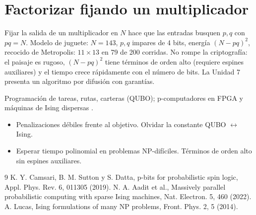 \documentclass[11pt,a4paper]{article}
\begin{document}
\section{Factorizar fijando un multiplicador}
Fijar la salida de un multiplicador en $N$ hace que las entradas busquen $p,q$ con $pq=N$. Modelo de juguete: $N=143$, $p,q$ impares de 4 bits, energía
$(N-pq)^2$, recocido de Metropolis: $11\times13$ en 79 de 200 corridas. No rompe la criptografía: el paisaje es rugoso, $(N-pq)^2$ tiene términos de orden
alto (requiere espines auxiliares) y el tiempo crece rápidamente con el número de bits. La Unidad 7 presenta un algoritmo por difusión con garantías.

\begin{aplicacion}
Programación de tareas, rutas, carteras (QUBO); p-computadores en FPGA y máquinas de Ising dispersas \cite{aadit}.
\end{aplicacion}

\begin{error}
\begin{itemize}[nosep]
\item Penalizaciones débiles frente al objetivo. \quad Olvidar la constante QUBO $\leftrightarrow$ Ising.
\item Esperar tiempo polinomial en problemas NP-difíciles. \quad Términos de orden alto sin espines auxiliares.
\end{itemize}
\end{error}

\begin{thebibliography}{9}\small
{} K. Y. Camsari, B. M. Sutton y S. Datta, p-bits for probabilistic spin logic, Appl. Phys. Rev. 6, 011305 (2019).
 N. A. Aadit et al., Massively parallel probabilistic computing with sparse Ising machines, Nat. Electron. 5, 460 (2022).
 A. Lucas, Ising formulations of many NP problems, Front. Phys. 2, 5 (2014).
\end{thebibliography}
\end{document}
